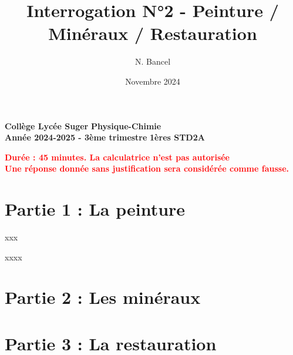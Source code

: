 \documentclass{exam}
\title{Interrogation N°2 - Peinture / Minéraux / Restauration}
\author{N. Bancel}
\date{Novembre 2024}
\begin{document}
\textbf{Collège Lycée Suger}
\hfill
\textbf{Physique-Chimie} \\

\textbf{Année 2024-2025 - 3ème trimestre}
\hfill
\textbf{1ères STD2A} \par

{\let\newpage\relax\maketitle}

\begin{center}
\textbf{\textcolor{red}{Durée : 45 minutes. La calculatrice n'est pas autorisée}} \\
\textbf{\textcolor{red}{Une réponse donnée sans justification sera considérée comme fausse.}} \\

\end{center}

\section*{Partie 1 : La peinture}

\begin{questions}
  \question[1] xxx

  \question[1] xxxx
\end{questions}

\section*{Partie 2 : Les minéraux}

\section*{Partie 3 : La restauration}
\end{document}
